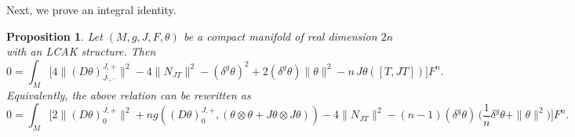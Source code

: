 \documentclass[a4paper,11pt]{amsart}
\newtheorem{prop}[thm]{Proposition}
\theoremstyle{definition}
\renewcommand{\[}{\begin{equation*}}
\renewcommand{\]}{\end{equation*}}
\begin{document}
\noindent Next, we prove an integral identity.
\begin{prop} \label{intf1-lcak-prop}
Let $(M, g, J, F, \theta)$ be a compact manifold of real dimension $2n$ with an LCAK structure.
Then
\begin{equation} \label{intf1-lcak}
    0 = \int_M \Big[4 \|(D\theta)^{J,+}_{J\cdot,\cdot}\|^2 - 4\|N_{JT}\|^2 - (\delta^g \theta)^2  + 2(\delta^g \theta) \|\theta\|^2 - n\, J\theta([T,JT]) \Big]
 F^n.
\end{equation} 
Equivalently, the above relation can be rewritten as
\begin{equation} \label{intf1-lcak-v2}
    0 = \int_M \Big[2 \|(D\theta)^{J,+}_{0}\|^2 + n g \left( (D\theta)^{J,+}_{0}  , (\theta \otimes \theta  + J\theta \otimes J\theta ) \right)- 4\|N_{JT}\|^2   - (n-1) (\delta^g \theta) \, \Big(\frac{1}{n} \delta^g \theta + \|\theta \|^2 \Big) \Big]
 F^n.
\end{equation}

\end{prop}
\end{document}
